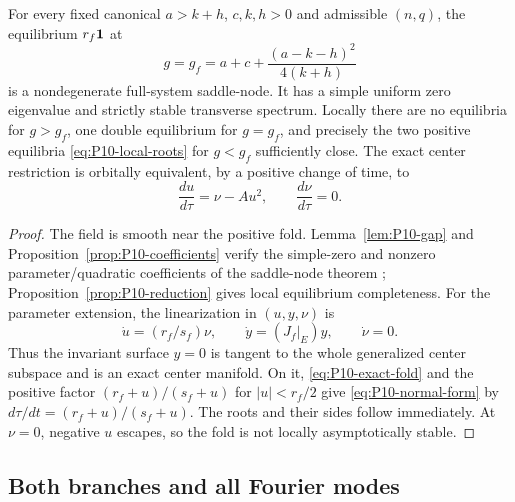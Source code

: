 \begin{theorem}
\label{thm:P10-saddle-node}
For every fixed canonical $a>k+h$, $c,k,h>0$ and admissible $(n,q)$,
the equilibrium $r_f\mathbf{1}$ at
\[
 \boxed{g=g_f=a+c+\frac{(a-k-h)^2}{4(k+h)}}
\]
is a nondegenerate full-system saddle-node. It has a simple uniform
zero eigenvalue and strictly stable transverse spectrum. Locally there
are no equilibria for $g>g_f$, one double equilibrium for $g=g_f$,
and precisely the two positive equilibria \eqref{eq:P10-local-roots}
for $g<g_f$ sufficiently close. The exact center restriction is
orbitally equivalent, by a positive change of time, to
\begin{equation}
 \boxed{\frac{du}{d\tau}=\nu-Au^2,\qquad \frac{d\nu}{d\tau}=0.}
 \label{eq:P10-normal-form}
\end{equation}
\end{theorem}
\begin{proof}
The field is smooth near the positive fold. Lemma~\ref{lem:P10-gap}
and Proposition~\ref{prop:P10-coefficients} verify the simple-zero
and nonzero parameter/quadratic coefficients of the saddle-node theorem
\cite{KuznetsovFold2006,GuckenheimerHolmes1983};
Proposition~\ref{prop:P10-reduction} gives local equilibrium completeness.
For the parameter extension, the linearization in $(u,y,\nu)$ is
\begin{equation}
 \dot u=(r_f/s_f)\nu,\qquad \dot y=(J_f|_E)y,\qquad\dot\nu=0.
 \label{eq:P10-extended-linear}
\end{equation}
Thus the invariant surface $y=0$ is tangent to the whole generalized
center subspace and is an exact center manifold. On it,
\eqref{eq:P10-exact-fold} and the positive factor
$(r_f+u)/(s_f+u)$ for $|u|<r_f/2$ give
\eqref{eq:P10-normal-form} by $d\tau/dt=(r_f+u)/(s_f+u)$.
The roots and their sides follow immediately. At $\nu=0$, negative
$u$ escapes, so the fold is not locally asymptotically stable.
\end{proof}

\subsection{Both branches and all Fourier modes}
\label{slot:P10-2}

